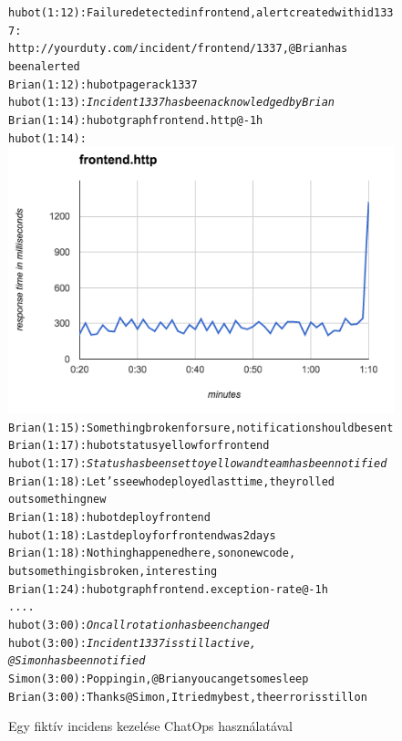 \begin{figure}[ht]
  \begin{alltt}
hubot (1:12): Failure detected in frontend, alert created with id 1337:
              http://yourduty.com/incident/frontend/1337, @Brian has 
              been alerted
Brian (1:12): hubot pager ack 1337
hubot (1:13): \emph{Incident 1337 has been acknowledged by Brian}
Brian (1:14): hubot graph frontend.http @-1h
hubot (1:14):
\includegraphics[scale=.6]{assets/frontend_http.png}
Brian (1:15): Something broken for sure, notification should be sent
Brian (1:17): hubot status yellow for frontend 
hubot (1:17): \emph{Status has been set to yellow and team has been notified}
Brian (1:18): Let's see who deployed last time, they rolled 
              out something new
Brian (1:18): hubot deploy frontend
hubot (1:18): Last deploy for frontend was 2 days
Brian (1:18): Nothing happened here, so no new code,
              but something is broken, interesting
Brian (1:24): hubot graph frontend.exception-rate @-1h
....
hubot (3:00): \emph{Oncall rotation has been changed}
hubot (3:00): \emph{Incident 1337 is still active, 
              @Simon has been notified}
Simon (3:00): Popping in, @Brian you can get some sleep
Brian (3:00): Thanks @Simon, I tried my best, the error is still on
  \end{alltt}
  \caption[DUMMY]%
  {Egy fiktív incidens kezelése ChatOps használatával}%
  \label{lst:oncall_message}
\end{figure}

